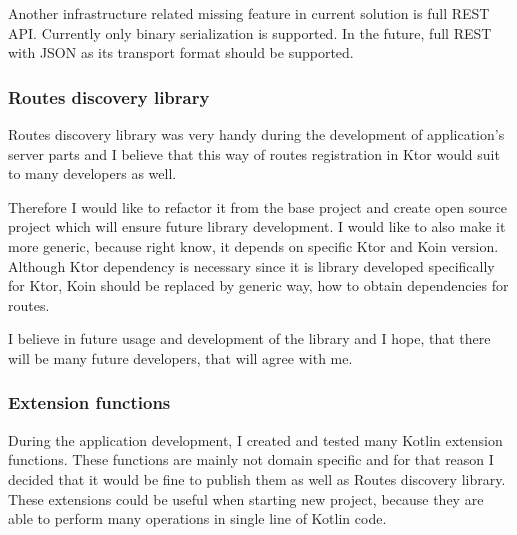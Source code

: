 Another infrastructure related missing feature in current solution is full REST API.
Currently only binary serialization is supported.
In the future, 
full REST with JSON as its transport format should be supported.

\subsubsection{Routes discovery library}
Routes discovery library was very handy during the development of application's server parts 
and I believe that this way of routes registration in Ktor would suit to many developers as well.

Therefore I would like to refactor it from the base project 
and create open source project which will ensure future library development.
I would like to also make it more generic,
because right know, 
it depends on specific Ktor and Koin version.
Although Ktor dependency is necessary
since it is library developed specifically for Ktor,
Koin should be replaced by generic way, 
how to obtain dependencies for routes.

I believe in future usage and development of the library
and I hope, 
that there will be many future developers,
that will agree with me.


\subsubsection{Extension functions}
During the application development,
I created and tested many Kotlin extension functions.
These functions are mainly not domain specific
and for that reason I decided that it would be fine to publish them as well as Routes discovery library.
These extensions could be useful when starting new project,
because they are able to perform many operations in single line of Kotlin code.